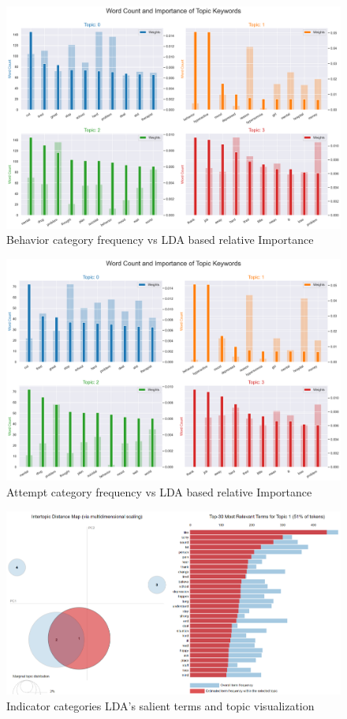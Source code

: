 \documentclass[sn-mathphys,Numbered]{sn-jnl}%
\theoremstyle{thmstyleone}%
\theoremstyle{thmstyletwo}%
\theoremstyle{thmstylethree}%
\begin{document}
\begin{figure}[H]
    \includegraphics[width=\textwidth]{behavior_weight_relative_imp.png}
    \caption{Behavior category frequency vs LDA based relative Importance}
    \label{behavior_weight_relative_imp}
\end{figure}
\hfill
\begin{figure}[H]
    \includegraphics[width=\textwidth]{attempt_weight_relative_imp.png}
    \caption{Attempt category frequency vs LDA based relative Importance}
    \label{attempt_weight_relative_imp}
\end{figure}   


 

\begin{figure}[h!]
\centering
    \includegraphics[width=\textwidth]{indicator_pyldvis.png}
    \caption{Indicator categories LDA's salient terms and topic visualization}
    \label{indicator_pyldvis}
\end{figure}
\end{document}
